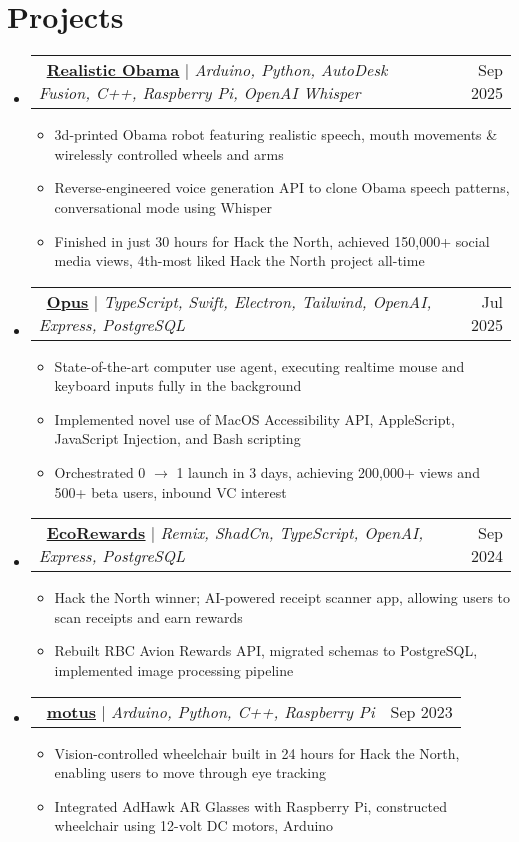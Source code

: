 \documentclass[letterpaper,11pt]{article}
\makeatletter
\newcommand{\resumeItem}[1]{
  \item\small{
    {#1 \vspace{-2pt}}
  }
}
\newcommand{\resumeProjectHeading}[2]{
    \item
    \begin{tabular*}{0.97\textwidth}{l@{\extracolsep{\fill}}r}
      \small#1 & #2 \\
    \end{tabular*}\vspace{-7pt}
}
\newcommand{\resumeSubHeadingListStart}{\begin{itemize}[leftmargin=0.15in, label={}]}
\newcommand{\resumeSubHeadingListEnd}{\end{itemize}}
\newcommand{\resumeItemListStart}{\begin{itemize}}
\newcommand{\resumeItemListEnd}{\end{itemize}\vspace{-5pt}}
\makeatother
\begin{document}
\section{Projects}
    \resumeSubHeadingListStart
    \resumeProjectHeading
      {\faGithub\ \href{https://github.com/yourself1011/obama}{\textbf{\underline{Realistic Obama}}} $|$ \emph{Arduino, Python, AutoDesk Fusion, C++, Raspberry Pi, OpenAI Whisper}}{Sep 2025}
      \resumeItemListStart
        \resumeItem{3d-printed Obama robot featuring realistic speech, mouth movements \& wirelessly controlled wheels and arms}
        \resumeItem{Reverse-engineered voice generation API to clone Obama speech patterns, conversational mode using Whisper}
        \resumeItem{Finished in just 30 hours for Hack the North, achieved 150,000+ social media views, 4th-most liked Hack the North project all-time}
      \resumeItemListEnd
      \resumeProjectHeading
          {\faGithub\ \href{https://github.com/jeffrey-zang/opus}{\textbf{\underline{Opus}}} $|$ \emph{TypeScript, Swift, Electron, Tailwind, OpenAI, Express, PostgreSQL}}{Jul 2025}
          \resumeItemListStart
            \resumeItem{State-of-the-art computer use agent, executing realtime mouse and keyboard inputs fully in the background}
            \resumeItem{Implemented novel use of MacOS Accessibility API, AppleScript, JavaScript Injection, and Bash scripting}
            \resumeItem{Orchestrated 0 \(\rightarrow\) 1 launch in 3 days, achieving 200,000+ views and 500+ beta users, inbound VC interest}
          \resumeItemListEnd
      \resumeProjectHeading
          {\faGithub\ \href{https://github.com/jeffrey-zang/ecorewards}{\textbf{\underline{EcoRewards}}} $|$ \emph{Remix, ShadCn, TypeScript, OpenAI, Express, PostgreSQL}}{Sep 2024}
          \resumeItemListStart
            \resumeItem{Hack the North winner; AI-powered receipt scanner app, allowing users to scan receipts and earn rewards}
            \resumeItem{Rebuilt RBC Avion Rewards API, migrated schemas to PostgreSQL, implemented image processing pipeline}
          \resumeItemListEnd
      \resumeProjectHeading
        {\faGithub\ \href{https://github.com/jeffrey-zang/motus}{\textbf{\underline{motus}}} $|$ \emph{Arduino, Python, C++, Raspberry Pi}}{Sep 2023}
          \resumeItemListStart
            \resumeItem{Vision-controlled wheelchair built in 24 hours for Hack the North, enabling users to move through eye tracking}
            \resumeItem{Integrated AdHawk AR Glasses with Raspberry Pi, constructed wheelchair using 12-volt DC motors, Arduino}
          \resumeItemListEnd
    \resumeSubHeadingListEnd
\end{document}
